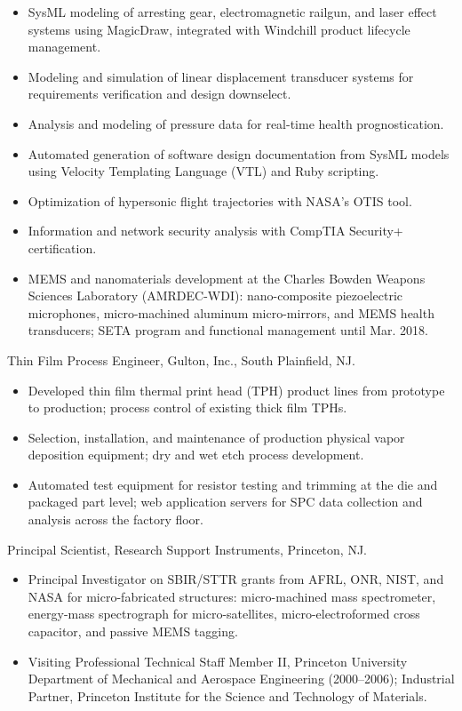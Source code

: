 \documentclass[american]{cv}
\begin{document}
\begin{topic}
\begin{itemize}
\item SysML modeling of arresting gear, electromagnetic railgun, and laser
effect systems using MagicDraw, integrated with Windchill product lifecycle
management.
\item Modeling and simulation of linear displacement transducer systems for
requirements verification and design downselect.
\item Analysis and modeling of pressure data for real-time health
prognostication.
\item Automated generation of software design documentation from SysML models
using Velocity Templating Language (VTL) and Ruby scripting.
\item Optimization of hypersonic flight trajectories with NASA's OTIS tool.
\item Information and network security analysis with CompTIA Security+
certification.
\item MEMS and nanomaterials development at the Charles Bowden Weapons
Sciences Laboratory (AMRDEC-WDI): nano-composite piezoelectric microphones,
micro-machined aluminum micro-mirrors, and MEMS health transducers; SETA
program and functional management until Mar. 2018.
\end{itemize}

\item [July 2007 - March 2010] Thin Film Process Engineer, Gulton, Inc.,
South Plainfield, NJ.

\begin{itemize}
    \item Developed thin film thermal print head (TPH) product lines from
    prototype to production; process control of existing thick film TPHs.
    \item Selection, installation, and maintenance of production physical
    vapor deposition equipment; dry and wet etch process development.
    \item Automated test equipment for resistor testing and trimming at the
    die and packaged part level; web application servers for SPC data
    collection and analysis across the factory floor.
\end{itemize}

\item [April 2000 - July 2007] Principal Scientist, Research Support
Instruments, Princeton, NJ.

\begin{itemize}
    \item Principal Investigator on SBIR/STTR grants from AFRL, ONR, NIST,
    and NASA for micro-fabricated structures: micro-machined mass
    spectrometer, energy-mass spectrograph for micro-satellites,
    micro-electroformed cross capacitor, and passive MEMS tagging.
    \item Visiting Professional Technical Staff Member II, Princeton
    University Department of Mechanical and Aerospace Engineering
    (2000--2006); Industrial Partner, Princeton Institute for the Science and
    Technology of Materials.
\end{itemize}


\end{topic}
\end{document}
